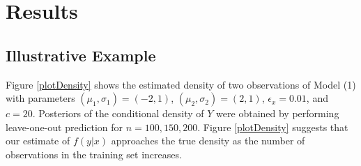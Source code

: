 



\section{Results}

\subsection{Illustrative Example}


Figure \ref{plotDensity} shows the estimated density of two observations of Model (1) with parameters $(\mu_1,\sigma_1)=(-2,1)$, $(\mu_2,\sigma_2)=(2,1)$, $\epsilon_x=0.01$, and $c=20$. Posteriors of the conditional density of $Y$  were obtained by performing leave-one-out prediction for  $n=100, 150, 200$. Figure \ref{plotDensity} suggests that our estimate of $f(y|x)$ approaches the true density as the number of observations in the training set increases.

